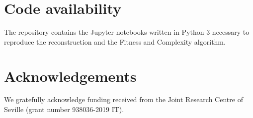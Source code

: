 \documentclass[fleqn,10pt]{article}
\begin{document}
\section*{Code availability}
The repository contains the Jupyter notebooks written in Python 3 necessary to reproduce the reconstruction and the Fitness and Complexity algorithm.


\section*{Acknowledgements}
We gratefully acknowledge funding received from the Joint Research Centre of Seville (grant number 938036-2019 IT).




\end{document}

